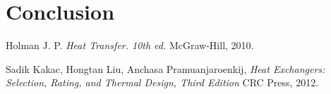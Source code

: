 \documentclass{article}
\begin{document}

\section{Conclusion}

\begin{thebibliography}{9}

    Holman J. P.
    \emph{Heat Transfer. 10th ed.}
    McGraw-Hill,
    2010.

    Sadik Kakac, Hongtan Liu, Anchasa Pramuanjaroenkij,
    \emph{Heat Exchangers: Selection, Rating, and Thermal Design, Third Edition}
    CRC Press,
    2012.


\end{thebibliography}
\end{document}
